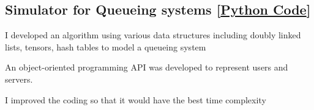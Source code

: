 \documentclass[letter,10pt]{article}
\begin{document}
	\subsection{Simulator for Queueing systems [\href{https://github.com/Hadi2525/queueing_theory}{Python Code}]}
	\begin{zitemize}
		\item I developed an algorithm using various data structures including doubly linked lists, tensors, hash tables to model a queueing system
		\item An object-oriented programming API was developed to represent users and servers.
		\item I improved the coding so that it would have the best time complexity 
	\end{zitemize}
	
	
\end{document}

